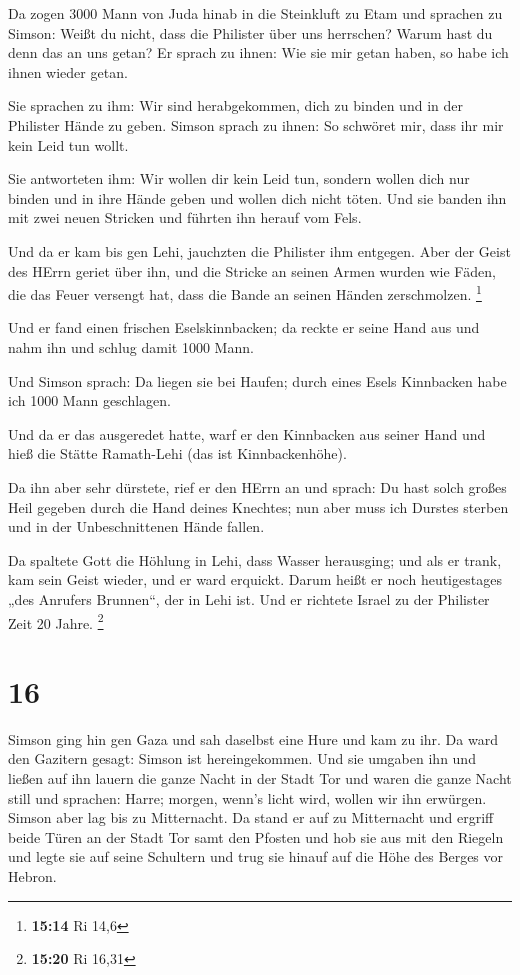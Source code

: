  Da zogen 3000 Mann von Juda hinab in die Steinkluft zu
Etam und sprachen zu Simson: Weißt du nicht, dass die Philister über uns
herrschen? Warum hast du denn das an uns getan? Er sprach zu ihnen: Wie
sie mir getan haben, so habe ich ihnen wieder getan.

 Sie sprachen zu ihm: Wir sind herabgekommen, dich zu
binden und in der Philister Hände zu geben. Simson sprach zu ihnen: So
schwöret mir, dass ihr mir kein Leid tun wollt.

 Sie antworteten ihm: Wir wollen dir kein Leid tun, sondern
wollen dich nur binden und in ihre Hände geben und wollen dich nicht
töten. Und sie banden ihn mit zwei neuen Stricken und führten ihn herauf
vom Fels.

 Und da er kam bis gen Lehi, jauchzten die Philister ihm
entgegen. Aber der Geist des HErrn geriet über ihn, und die Stricke an
seinen Armen wurden wie Fäden, die das Feuer versengt hat, dass die
Bande an seinen Händen zerschmolzen. \footnote{\textbf{15:14} Ri 14,6}

 Und er fand einen frischen Eselskinnbacken; da reckte er
seine Hand aus und nahm ihn und schlug damit 1000 Mann.

 Und Simson sprach: Da liegen sie bei Haufen; durch eines
Esels Kinnbacken habe ich 1000 Mann geschlagen.

 Und da er das ausgeredet hatte, warf er den Kinnbacken aus
seiner Hand und hieß die Stätte Ramath-Lehi (das ist Kinnbackenhöhe).

 Da ihn aber sehr dürstete, rief er den HErrn an und
sprach: Du hast solch großes Heil gegeben durch die Hand deines
Knechtes; nun aber muss ich Durstes sterben und in der Unbeschnittenen
Hände fallen.

 Da spaltete Gott die Höhlung in Lehi, dass Wasser
herausging; und als er trank, kam sein Geist wieder, und er ward
erquickt. Darum heißt er noch heutigestages „des Anrufers Brunnen``, der
in Lehi ist.  Und er richtete Israel zu der Philister Zeit
20 Jahre. \footnote{\textbf{15:20} Ri 16,31}

\hypertarget{section-7}{%
\section{16}\label{section-7}}

 Simson ging hin gen Gaza und sah daselbst eine Hure und kam
zu ihr.  Da ward den Gazitern gesagt: Simson ist
hereingekommen. Und sie umgaben ihn und ließen auf ihn lauern die ganze
Nacht in der Stadt Tor und waren die ganze Nacht still und sprachen:
Harre; morgen, wenn's licht wird, wollen wir ihn erwürgen. 
Simson aber lag bis zu Mitternacht. Da stand er auf zu Mitternacht und
ergriff beide Türen an der Stadt Tor samt den Pfosten und hob sie aus
mit den Riegeln und legte sie auf seine Schultern und trug sie hinauf
auf die Höhe des Berges vor Hebron.

